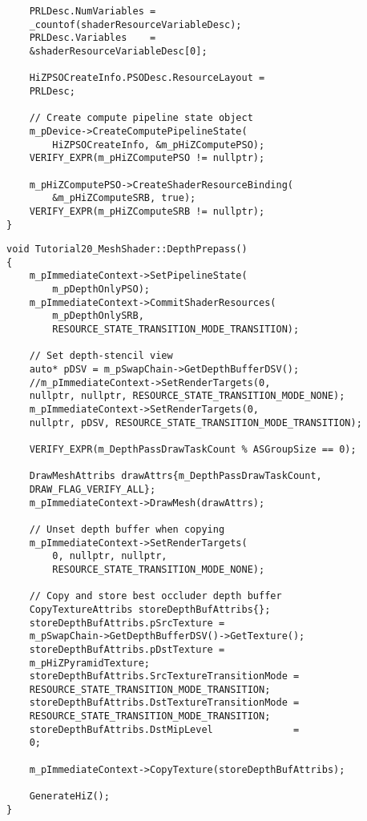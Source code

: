 \begin{lstlisting}
    PRLDesc.NumVariables = 
    _countof(shaderResourceVariableDesc);
    PRLDesc.Variables    = 
    &shaderResourceVariableDesc[0];

    HiZPSOCreateInfo.PSODesc.ResourceLayout = 
    PRLDesc;

    // Create compute pipeline state object
    m_pDevice->CreateComputePipelineState(
        HiZPSOCreateInfo, &m_pHiZComputePSO);
    VERIFY_EXPR(m_pHiZComputePSO != nullptr);

    m_pHiZComputePSO->CreateShaderResourceBinding(
        &m_pHiZComputeSRB, true);
    VERIFY_EXPR(m_pHiZComputeSRB != nullptr);
}
\end{lstlisting}

\begin{lstlisting}
void Tutorial20_MeshShader::DepthPrepass()
{
    m_pImmediateContext->SetPipelineState(
        m_pDepthOnlyPSO);
    m_pImmediateContext->CommitShaderResources(
        m_pDepthOnlySRB, 
        RESOURCE_STATE_TRANSITION_MODE_TRANSITION);

    // Set depth-stencil view
    auto* pDSV = m_pSwapChain->GetDepthBufferDSV();
    //m_pImmediateContext->SetRenderTargets(0, 
    nullptr, nullptr, RESOURCE_STATE_TRANSITION_MODE_NONE);
    m_pImmediateContext->SetRenderTargets(0, 
    nullptr, pDSV, RESOURCE_STATE_TRANSITION_MODE_TRANSITION);

    VERIFY_EXPR(m_DepthPassDrawTaskCount % ASGroupSize == 0);

    DrawMeshAttribs drawAttrs{m_DepthPassDrawTaskCount, 
    DRAW_FLAG_VERIFY_ALL};
    m_pImmediateContext->DrawMesh(drawAttrs);
    
    // Unset depth buffer when copying
    m_pImmediateContext->SetRenderTargets(
        0, nullptr, nullptr, 
        RESOURCE_STATE_TRANSITION_MODE_NONE);

    // Copy and store best occluder depth buffer
    CopyTextureAttribs storeDepthBufAttribs{};
    storeDepthBufAttribs.pSrcTexture = 
    m_pSwapChain->GetDepthBufferDSV()->GetTexture();
    storeDepthBufAttribs.pDstTexture = 
    m_pHiZPyramidTexture;
    storeDepthBufAttribs.SrcTextureTransitionMode = 
    RESOURCE_STATE_TRANSITION_MODE_TRANSITION;
    storeDepthBufAttribs.DstTextureTransitionMode = 
    RESOURCE_STATE_TRANSITION_MODE_TRANSITION;
    storeDepthBufAttribs.DstMipLevel              = 
    0;

    m_pImmediateContext->CopyTexture(storeDepthBufAttribs);

    GenerateHiZ();
}
\end{lstlisting}

